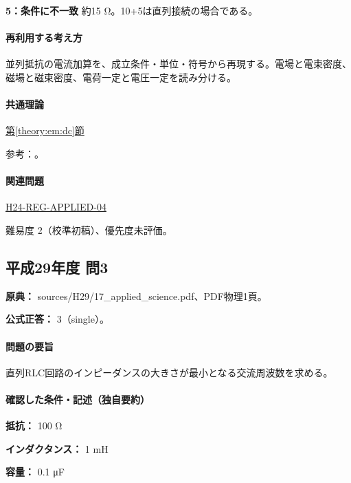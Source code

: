\noindent\textbf{5：条件に不一致} 約15 Ω。10+5は直列接続の場合である。\par

\paragraph{再利用する考え方} 並列抵抗の電流加算を、成立条件・単位・符号から再現する。電場と電束密度、磁場と磁束密度、電荷一定と電圧一定を読み分ける。

\paragraph{共通理論} \hyperref[theory:em:dc]{第\ref*{theory:em:dc}節}

\par 参考：\cite{mit_em07}。

\paragraph{関連問題} \hyperref[q:h24-reg-applied-04]{H24-REG-APPLIED-04}

\par 難易度 2（校準初稿）、優先度未評価。

\subsection{平成29年度 問3}
\label{q:h29-reg-applied-03}

\noindent\textbf{原典：} sources/H29/17\_applied\_science.pdf、PDF物理1頁。

\textbf{公式正答：} 3（single）。

\paragraph{問題の要旨} 直列RLC回路のインピーダンスの大きさが最小となる交流周波数を求める。

\paragraph{確認した条件・記述（独自要約）}\mbox{}\par

\noindent\textbf{抵抗：} 100 Ω\par

\noindent\textbf{インダクタンス：} 1 mH\par

\noindent\textbf{容量：} 0.1 μF\par

